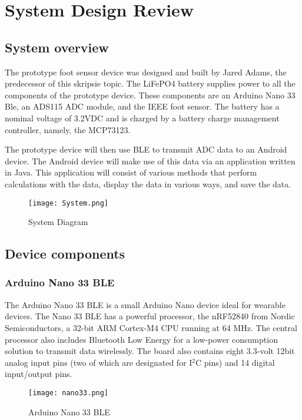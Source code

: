 \graphicspath{{systemdesign/fig/}}
\chapter{System Design Review}
\label{chap:systemdesign}

\section{System overview}

The prototype foot sensor device was designed and built by Jared Adams, the predecessor of this skripsie topic.
The LiFePO4 battery supplies power to all the components of the prototype device. These components are an Arduino Nano 33 Ble, an ADS115 ADC module, and the IEEE foot sensor. The battery has a nominal voltage of 3.2VDC and is charged by a battery charge management controller, namely, the MCP73123.

The prototype device will then use BLE to transmit ADC data to an Android device. The Android device will make use of this data via an application written in Java. This application will consist of various methods that perform calculations with the data, display the data in various ways, and save the data.


\begin{figure}[!h]
    \centering
    \texttt{[image: System.png]}
    \caption{System Diagram}
    \label{fig:sysdiagram}
\end{figure}
\section{Device components}

\subsection{Arduino Nano 33 BLE}
The Arduino Nano 33 BLE is a small Arduino Nano device ideal for wearable devices. The Nano 33 BLE has a powerful processor, the nRF52840 from Nordic Semiconductors, a 32-bit ARM Cortex-M4 CPU running at 64 MHz. The central processor also includes Bluetooth Low Energy for a low-power consumption solution to transmit data wirelessly. The board also contains eight 3.3-volt 12bit analog input pins (two of which are designated for I$^2$C pins) and 14 digital input/output pins. 

\begin{figure}[!h]
    \centering
    \texttt{[image: nano33.png]}
    \caption{Arduino Nano 33 BLE}
    \label{fig:arduino}
\end{figure}


